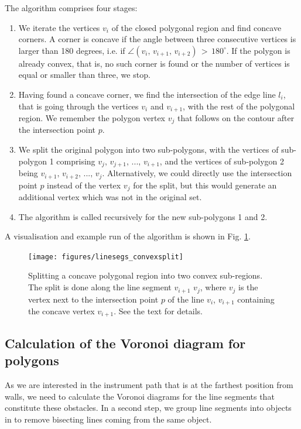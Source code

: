 The algorithm \cite{Hegazy2014} comprises four stages: 
\begin{enumerate}
	\item We iterate the vertices $v_i$ of the closed polygonal region and find concave corners.
		A corner is concave if the angle between three consecutive vertices is larger than 180 degrees,
		i.e. if $\angle\left(v_{i},\, v_{i+1},\, v_{i+2}\right) \, >\,  180^{\circ}$.
		If the polygon is already convex, that is, no such corner is found or the number of vertices is 
		equal or smaller than three, we stop.
	\item Having found a concave corner, we find the intersection of the edge line $l_i$, that is going 
		through the vertices $v_{i}$ and $v_{i+1}$, with the rest of the polygonal region.
		We remember the polygon vertex $v_j$ that follows on the contour after the intersection point $p$.
	\item We split the original polygon into two sub-polygons, with the vertices of sub-polygon 1 comprising
		$v_j,\, v_{j+1},\, ...,\, v_{i+1} $, and the vertices of sub-polygon 2 being $v_{i+1},\, v_{i+2},\, ...,\, v_j$.
		Alternatively, we could directly use the intersection point $p$ instead of the vertex $v_j$ for
		the split, but this would generate an additional vertex which was not in the original set.
	\item The algorithm is called recursively for the new sub-polygons 1 and 2.
\end{enumerate}
A visualisation and example run of the algorithm is shown in Fig. \ref{fig:contour_splitting}.


\begin{figure}[htb]
	\centering
	\texttt{[image: figures/linesegs\_convexsplit]}
	\caption[Splitting of concave regions.]{
		Splitting a concave polygonal region into two convex sub-regions. The split is done 
		along the line segment $v_{i+1}$ $v_{j}$, where $v_j$ is the vertex next to the intersection
		point $p$ of the line $v_i$, $v_{i+1}$ containing the concave vertex $v_{i+1}$. See the text
		for details.
		\label{fig:contour_splitting}}
\end{figure}



\subsection{Calculation of the Voronoi diagram for polygons}
\label{sec:polygonal_voronoi_diagram}
As we are interested in the instrument path that is at the farthest position 
from walls, we need to calculate the Voronoi diagrams for the line segments 
that constitute these obstacles. 
In a second step, we group line segments into objects in to remove bisecting lines 
coming from the same object.

